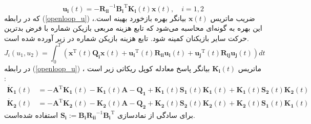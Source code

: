 \begin{equation}\label{openloop_u}
	\boldsymbol{u_i}(t) = -\boldsymbol{R_{ii}}^{-1}\boldsymbol{B_i}^\mathrm{T}\boldsymbol{K_{i}}(t)\boldsymbol{x}(t),\quad i = 1, 2
\end{equation}
که در رابطه 
(\ref{openloop_u})
،ضریب ماتریس $\boldsymbol{x}(t)$ بیانگر بهره بازخورد بهینه است. این بهره به گونه‌ای محاسبه می‌شود که تابع هزینه مربعی بازیکن شماره  با فرض بدترین حرکت سایر بازیکنان کمینه شود. تابع هزینه بازیکن شماره  در زیر آورده شده است.
 \begin{equation}
	J_i(u_1, u_2) = \int_{0}^{T}\left( \boldsymbol{x} ^\mathrm{T}(t) \boldsymbol{Q_i} \boldsymbol{x}(t)+
	\boldsymbol{u_i} ^\mathrm{T}(t) \boldsymbol{R_{ii}} \boldsymbol{u_i}(t)+
	\boldsymbol{u_j} ^\mathrm{T}(t)\boldsymbol{ R_{ij} u_j}(t)
	\right)dt
\end{equation}
در رابطه 
(\ref{openloop_u})
، ماتریس $\boldsymbol{K_{i}}(t)$ بیانگر پاسخ معادله کوپل ریكاتی
 زیر است
 \cite{diff_game}:
\begin{equation}\label{coupled_riccatti_LQDG}
\begin{split}
	\boldsymbol{\dot{K}_1}(t) &= -\boldsymbol{A}^\mathrm{T}\boldsymbol{K_1}(t) - \boldsymbol{K_1}(t)\boldsymbol{A} - \boldsymbol{Q_1} +\boldsymbol{K_1}(t)\boldsymbol{S_1}(t)\boldsymbol{K_1}(t) + \boldsymbol{K_1}(t)\boldsymbol{S_2}(t)\boldsymbol{K_2}(t)\\
	\boldsymbol{\dot{K}_2}(t) &= -\boldsymbol{A}^\mathrm{T}\boldsymbol{K_2}(t) - \boldsymbol{K_2}(t)\boldsymbol{A} - \boldsymbol{Q_2} +\boldsymbol{K_2}(t)\boldsymbol{S_2}(t)\boldsymbol{K_2}(t) + \boldsymbol{K_2}(t)\boldsymbol{S_1}(t)\boldsymbol{K_1}(t)
\end{split}
\end{equation}
برای سادگی از نمادسازی
$\boldsymbol{S_i} := \boldsymbol{B_iR_{ii}}^{-1}\boldsymbol{B_i}^\mathrm{T}$
  استفاده شده‌است. 


